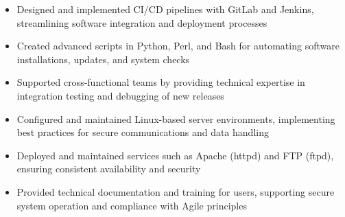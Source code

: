 \par\smallskip
\noindent
\begin{minipage}{20cm}
  \begin{minipage}{9.75cm}
    \begin{itemize}
      \item Designed and implemented CI/CD pipelines with GitLab and Jenkins, streamlining software integration and deployment processes
      \item Created advanced scripts in Python, Perl, and Bash for automating software installations, updates, and system checks
      \item Supported cross-functional teams by providing technical expertise in integration testing and debugging of new releases
    \end{itemize}
  \end{minipage}
  \hfill
  \begin{minipage}{9.75cm}
    \begin{itemize}
      \item Configured and maintained Linux-based server environments, implementing best practices for secure communications and data handling
      \item Deployed and maintained services such as Apache (httpd) and FTP (ftpd), ensuring consistent availability and security
      \item Provided technical documentation and training for users, supporting secure system operation and compliance with Agile principles
    \end{itemize}
  \end{minipage}
\end{minipage}
\par\smallskip
\divider

